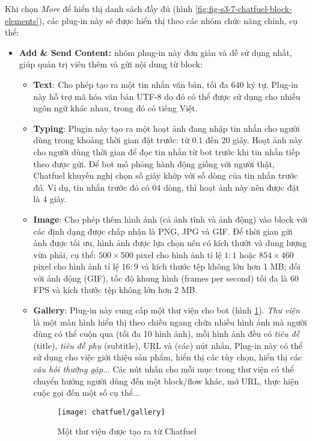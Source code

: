 Khi chọn \textit{More} để hiển thị danh sách đầy đủ (hình \ref{fig:fig-s3-7-chatfuel-block-elements}), các plug-in này sẽ được hiển thị theo các nhóm chức năng chính, cụ thể:
\begin{itemize}
	\item \textbf{Add \& Send Content:} nhóm phug-in này đơn giản và dễ sử dụng nhất, giúp quản trị viên thêm và gửi nội dung từ block: \begin{itemize}
		\item \textbf{Text}: Cho phép tạo ra một tin nhắn văn bản, tối đa 640 ký tự. Plug-in này hỗ trợ mã hóa văn bản UTF-8 do đó có thể được sử dụng cho nhiều ngôn ngữ khác nhau, trong đó có tiếng Việt.
		\item \textbf{Typing}: Plugin này tạo ra một hoạt ảnh đang nhập tin nhắn cho người dùng trong khoảng thời gian đặt trước: từ $0.1$ đến $20$ giây. Hoạt ảnh này cho người dùng thời gian để đọc tin nhắn từ bot trước khi tin nhắn tiếp theo được gửi. Để bot mô phỏng hành động giống với người thật, Chatfuel khuyến nghị chọn số giây khớp với số dòng của tin nhắn trước đó. Ví dụ, tin nhắn trước đó có 04 dòng, thì hoạt ảnh này nên được đặt là 4 giây.
		\item \textbf{Image}: Cho phép thêm hình ảnh (cả ảnh tĩnh và ảnh động) vào block với các định dạng được chấp nhận là PNG, JPG và GIF. Để thời gian gửi ảnh được tối ưu, hình ảnh được lựa chọn nên có kích thướt và dung lượng vừa phải, cụ thể: $500\times 500$ pixel cho hình ảnh tỉ lệ $1:1$ hoặc $854\times 460$ pixel cho hình ảnh tỉ lệ $16:9$ và kích thước tệp không lớn hơn 1 MB; đối với ảnh động (GIF), tốc độ khung hình (frames per second) tối đa là 60 FPS và kích thước tệp không lớn hơn 2 MB.
		\item \textbf{Gallery}: Plug-in này cung cấp một thư viện cho bot (hình \ref{fig:fig-s3-8-chatfuel-gallery}). \textit{Thư viện} là một màn hình hiển thị theo chiều ngang chứa nhiều hình ảnh mà người dùng có thể cuộn qua (tối đa 10 hình ảnh), mỗi hình ảnh đều có \textit{tiêu đề} (title), \textit{tiêu đề phụ} (subtitle), URL và (các) nút nhấn. Plug-in này có thể sử dụng cho việc giới thiệu sản phẩm, hiển thị các tùy chọn, hiển thị các \textit{câu hỏi thường gặp}... Các nút nhấn cho mỗi mục trong thư viện có thể chuyển hướng người dùng đến một block/flow khác, mở URL, thực hiện cuộc gọi đến một số cụ thể...\par
		\begin{figure}[htb!]\centering
			\texttt{[image: chatfuel/gallery]}
			\caption{Một thư viện được tạo ra từ Chatfuel}
			\label{fig:fig-s3-8-chatfuel-gallery}

\end{figure}
\end{itemize}
\end{itemize}
